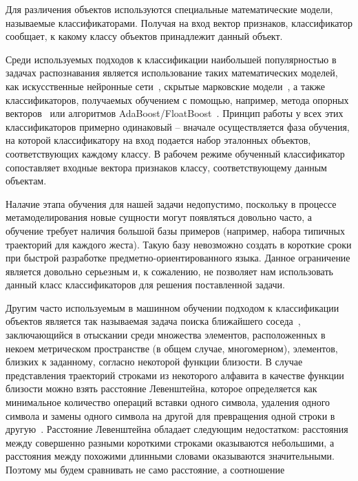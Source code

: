 \documentclass[a5paper]{article}
\begin{document}
Для различения объектов используются специальные математические модели, называемые классификаторами. Получая на вход вектор признаков,
классификатор сообщает, к какому классу объектов принадлежит данный объект. 

Среди используемых подходов к классификации наибольшей популярностью в задачах распознавания является 
использование таких математических моделей, как искусственные нейронные сети~\cite{neuronet1, neuronet2, neuronet3}, 
скрытые марковские модели~\cite{hmm1, hmm2, hmm3}, а также классификаторов, получаемых обучением с помощью, например, 
метода опорных векторов~\cite{svm1, svm2} или алгоритмов AdaBoost/FloatBoost~\cite{boosting1, boosting2}.
Принцип работы у всех этих классификаторов примерно одинаковый -- вначале осуществляется фаза обучения, на которой классификатору на вход
подается набор эталонных объектов, соответствующих каждому классу. В рабочем режиме обученный классификатор сопоставляет входные вектора 
признаков классу, соответствующему данным объектам.

Налачие этапа обучения для нашей задачи недопустимо, поскольку в процессе метамоделирования новые сущности могут появляться
довольно часто, а обучение требует наличия большой базы примеров (например, набора типичных траекторий для каждого жеста). Такую
базу невозможно создать в короткие сроки при быстрой разработке предметно-ориентированного языка. 
Данное ограничение является довольно серьезным и, к сожалению, не позволяет нам использовать данный класс классификаторов для решения 
поставленной задачи.

Другим часто используемым в машинном обучении подходом к классификации объектов является так называемая задача поиска ближайшего 
соседа~\cite{nns1, nns2}, заключающийся в отыскании среди множества элементов, расположенных в некоем метрическом пространстве (в 
общем случае, многомерном), элементов, близких к заданному, согласно некоторой функции близости. 
В случае представления траекторий строками из некоторого алфавита в качестве функции близости можно взять расстояние Левенштейна, 
которое определяется как минимальное количество операций вставки одного символа, удаления одного символа и замены 
одного символа на другой для превращения одной строки в другую~\cite{levenshtein}. Расстояние Левенштейна обладает следующим недостатком:
расстояния между совершенно разными короткими строками оказываются небольшими, а расстояния между похожими длинными словами 
оказываются значительными. Поэтому мы будем сравнивать не само расстояние, а соотношение 
\end{document}
